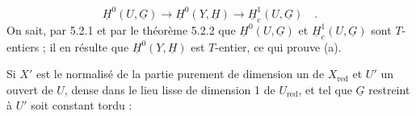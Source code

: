 \begin{equation*}
\underline{H}^0(U,\underline{G}) \longrightarrow \underline{H}^0(Y,\underline{H}) \longrightarrow \underline{H}^1_c(U,\underline{G}) \quad .
\end{equation*}
On sait, par 5.2.1 et par le théorème 5.2.2 que $\underline{H}^0(U,\underline{G})$ et $\underline{H}^1_c(U,\underline{G})$ sont $T$-entiers ; il en résulte que $\underline{H}^0(Y,\underline{H})$ est $T$-entier, ce qui prouve (a).

Si $X'$ est le normalisé de la partie purement de dimension un de $X_{\mathrm{red}}$ et $U'$ un ouvert de $U$, dense dans le lieu lisse de dimension 1 de $U_{\mathrm{red}}$, et tel que $\underline{G}$ restreint à $U'$ soit constant tordu :

\begin{center}
\end{center}
